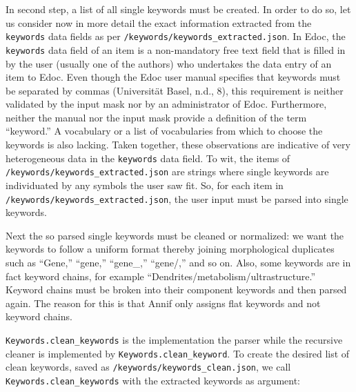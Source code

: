 In second step, a list of all single keywords must be created. In order
to do so, let us consider now in more detail the exact information
extracted from the \texttt{keywords} data fields as per
\texttt{/keywords/keywords\_extracted.json}. In Edoc, the
\texttt{keywords} data field of an item is a non-mandatory free text
field that is filled in by the user (usually one of the authors) who
undertakes the data entry of an item to Edoc. Even though the Edoc user
manual specifies that keywords must be separated by commas (Universität
Basel, n.d., 8), this requirement is neither validated by the input mask
nor by an administrator of Edoc. Furthermore, neither the manual nor the
input mask provide a definition of the term ``keyword.'' A vocabulary or
a list of vocabularies from which to choose the keywords is also
lacking. Taken together, these observations are indicative of very
heterogeneous data in the \texttt{keywords} data field. To wit, the
items of \texttt{/keywords/keywords\_extracted.json} are strings where
single keywords are individuated by any symbols the user saw fit. So,
for each item in \texttt{/keywords/keywords\_extracted.json}, the user
input must be parsed into single keywords.

Next the so parsed single keywords must be cleaned or normalized: we
want the keywords to follow a uniform format thereby joining
morphological duplicates such as ``Gene,'' ``gene,'' ``gene\_,''
``gene/,'' and so on. Also, some keywords are in fact keyword chains,
for example ``Dendrites/metabolism/ultrastructure.'' Keyword chains must
be broken into their component keywords and then parsed again. The
reason for this is that Annif only assigns flat keywords and not keyword
chains.

\texttt{Keywords.clean\_keywords} is the implementation the parser while
the recursive cleaner is implemented by
\texttt{Keywords.clean\_keyword}. To create the desired list of clean
keywords, saved as \texttt{/keywords/keywords\_clean.json}, we call
\texttt{Keywords.clean\_keywords} with the extracted keywords as
argument:

\begin{Shaded}
\begin{Highlighting}[]
\OperatorTok{=}\NormalTok{)}
\OperatorTok{=}
\NormalTok{)}
\end{Highlighting}
\end{Shaded}

